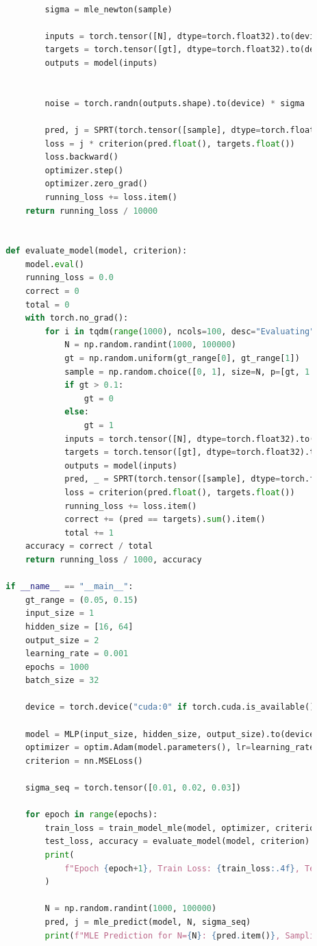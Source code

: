 \documentclass[withoutpreface,bwprint]{cumcmthesis} %
\begin{document}
\begin{appendices}
\begin{lstlisting}[language=python]
			  
				sigma = mle_newton(sample)
		
				inputs = torch.tensor([N], dtype=torch.float32).to(device)
				targets = torch.tensor([gt], dtype=torch.float32).to(device)
				outputs = model(inputs)
		
			 
				noise = torch.randn(outputs.shape).to(device) * sigma
		
				pred, j = SPRT(torch.tensor([sample], dtype=torch.float32).to(device), outputs + noise)
				loss = j * criterion(pred.float(), targets.float())
				loss.backward()
				optimizer.step()
				optimizer.zero_grad()
				running_loss += loss.item()
			return running_loss / 10000
		
		
		def evaluate_model(model, criterion):
			model.eval()
			running_loss = 0.0
			correct = 0
			total = 0
			with torch.no_grad():
				for i in tqdm(range(1000), ncols=100, desc="Evaluating"):
					N = np.random.randint(1000, 100000)
					gt = np.random.uniform(gt_range[0], gt_range[1])
					sample = np.random.choice([0, 1], size=N, p=[gt, 1 - gt])
					if gt > 0.1:
						gt = 0
					else:
						gt = 1
					inputs = torch.tensor([N], dtype=torch.float32).to(device)
					targets = torch.tensor([gt], dtype=torch.float32).to(device)
					outputs = model(inputs)
					pred, _ = SPRT(torch.tensor([sample], dtype=torch.float32).to(device), outputs)
					loss = criterion(pred.float(), targets.float())
					running_loss += loss.item()
					correct += (pred == targets).sum().item()
					total += 1
			accuracy = correct / total
			return running_loss / 1000, accuracy
		
		if __name__ == "__main__":
			gt_range = (0.05, 0.15)
			input_size = 1
			hidden_size = [16, 64]
			output_size = 2
			learning_rate = 0.001
			epochs = 1000
			batch_size = 32
		
			device = torch.device("cuda:0" if torch.cuda.is_available() else "cpu")
		
			model = MLP(input_size, hidden_size, output_size).to(device)
			optimizer = optim.Adam(model.parameters(), lr=learning_rate)
			criterion = nn.MSELoss()
		
			sigma_seq = torch.tensor([0.01, 0.02, 0.03]) 
		
			for epoch in range(epochs):
				train_loss = train_model_mle(model, optimizer, criterion, epoch, epochs)
				test_loss, accuracy = evaluate_model(model, criterion)
				print(
					f"Epoch {epoch+1}, Train Loss: {train_loss:.4f}, Test Loss: {test_loss:.4f}, Accuracy: {accuracy:.4f}"
				)
		
				N = np.random.randint(1000, 100000) 
				pred, j = mle_predict(model, N, sigma_seq)
				print(f"MLE Prediction for N={N}: {pred.item()}, Sampling Times: {j.item()}") 
	 \end{lstlisting}


\end{appendices}
\end{document}
